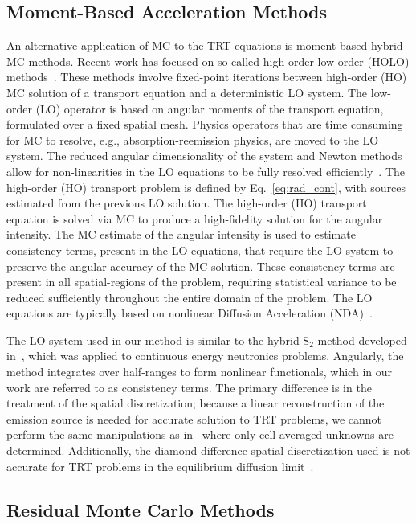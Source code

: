 \subsection{Moment-Based Acceleration Methods}

An alternative application of MC to the TRT equations is moment-based hybrid MC methods.
Recent work has focused on so-called high-order low-order (HOLO)
methods~\cite{willert,park,rmc,ans_2014,bolding_nse}. These methods involve fixed-point
iterations between high-order (HO) MC solution of a transport equation and a deterministic LO
system.  The low-order (LO)
operator is based on angular moments of the transport equation, formulated over a fixed
spatial mesh.  Physics operators that are time consuming for MC
to resolve, e.g., absorption-reemission physics, are moved to the LO
system.  The reduced angular dimensionality of the system and Newton methods allow for non-linearities in the LO equations to be fully
resolved efficiently~\cite{willert,park}.  The high-order (HO) transport problem is defined by 
Eq.~\eqref{eq:rad_cont}, with sources estimated from the previous LO solution.  
The high-order (HO) transport equation is solved via MC to produce a high-fidelity solution for
the angular intensity.  The MC estimate of the angular intensity is used to estimate
consistency terms,
present in the LO equations, that require the LO system to preserve the angular accuracy of the
MC solution.   
These consistency terms are present in all spatial-regions of the problem, requiring
statistical variance to be reduced sufficiently throughout the entire domain of the
problem.   The LO equations are typically based on nonlinear Diffusion Acceleration
(NDA)~\cite{willert,park}. 

The LO system used in our method is similar to the hybrid-S$_2$
method developed in~\cite{wolters}, which was applied to continuous energy neutronics
problems.  Angularly, the method integrates over half-ranges to form nonlinear
functionals, which in our work are referred to as consistency terms.  The primary difference is in the treatment of the spatial discretization;
because a linear reconstruction of the emission source is needed for accurate solution to TRT
problems, we cannot perform the same manipulations as in~\cite{wolters} where only
cell-averaged unknowns are determined.  Additionally, the diamond-difference spatial
discretization used is not accurate for TRT problems in the equilibrium diffusion
limit~\cite{larsen_edl}.


\subsection{Residual Monte Carlo Methods}

